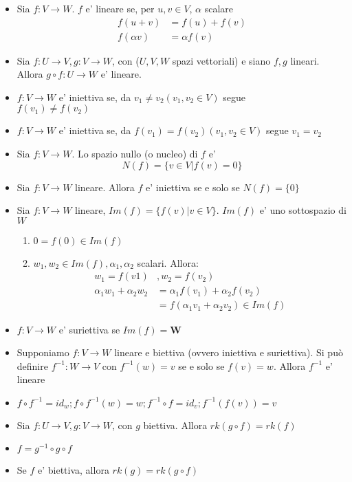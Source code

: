 \documentclass[a4paper, 10pt]{article}
\begin{document}
	\begin{itemize} 
	\item Sia $f : V \rightarrow W$. $f$ e' lineare se, per $u,v \in V$, $\alpha$ scalare 
	\begin{equation*}
		\begin{split}
		f(u + v) &= f(u) + f(v) \\
		f(\alpha v) &= \alpha f(v)
		\end{split}
	\end{equation*}
	
	\item Sia $f : U \rightarrow V, g:V \rightarrow W$, con ($U,V,W$ spazi vettoriali) 
						   e siano $f,g$ lineari. Allora $g \circ f : U \rightarrow W$ e' lineare.
	\item  $f : V \rightarrow W$ e' iniettiva se, da $v_1 \neq v_2 (v_1,v_2 \in V)$ 
						    segue \\ $f(v_1) \neq f(v_2)$
	\item $f : V \rightarrow W$ e' iniettiva se, da $f(v_1) = f(v_2) (v_1,v_2 \in V)$ 
						   segue $v_1 = v_2$
	\item Sia $f:V \rightarrow W$. Lo spazio nullo (o nucleo) di $f$ e'
						   \[N(f) = \lbrace v \in V \vert f(v) = 0 \rbrace \]
	\item Sia $f:V \rightarrow W$ lineare. Allora $f$ e' iniettiva se e solo 
						   se $N(f) = \lbrace 0 \rbrace$
	\item Sia $f : V \rightarrow W$ lineare, $Im(f) = \lbrace f(v) \vert v \in V \rbrace$.
				   $Im(f)$ e' uno sottospazio di $W$ 
				   \begin{enumerate}
				   	\item $0 = f(0) \in Im(f)$
				   	\item $w_1, w_2 \in Im(f), \alpha_1, \alpha_2$ scalari. Allora:
				   	\begin{equation*}
				   		\begin{split}
				   		w_1 = f(v1)&, w_2 = f(v_2) \\
				   		\alpha_1 w_1 + \alpha_2 w_2 &= \alpha_1 f(v_1) + \alpha_2 f(v_2) \\
				   		&= f(\alpha_1 v_1 + \alpha_2 v_2) \in Im(f)
				   		\end{split}
				   	\end{equation*}
				   	
				   \end{enumerate}
	\item $f:V \rightarrow W$ e' suriettiva se $Im(f) = \textbf{W}$
	\item Supponiamo $f:V \rightarrow W$ lineare e biettiva (ovvero iniettiva e suriettiva). 
		  Si può definire $f^{-1} : W \rightarrow V$ con $f^{-1}(w) = v$ se e solo se $f(v) = w$. 
		  Allora $f^{-1}$ e' lineare
	\item $f \circ f^{-1} = id_w; f \circ f^{-1}(w) = w ; f^{-1} \circ f = id_v ; f^{-1}(f(v)) = v$
	\item Sia $f : U \rightarrow V, g : V \rightarrow W$, con $g$ biettiva. Allora $rk(g \circ f) = rk(f)$
	\item $f = g^{-1} \circ g \circ f$
	\item Se $f$ e' biettiva, allora $rk(g) = rk(g \circ f)$
	\end{itemize}
\end{document}
